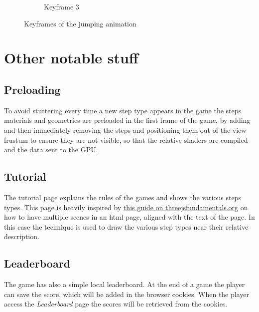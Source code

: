 \documentclass[12pt]{article}
\begin{document}
\begin{figure}[h]
\begin{subfigure}{.33\textwidth}
  \caption{Keyframe 3}
  \label{fig:key3}
 \end{subfigure}
\caption{Keyframes of the jumping animation}
\label{fig:keyframes}
\end{figure}

\newpage

\section{Other notable stuff}

\subsection{Preloading}
To avoid stuttering every time a new step type appears in the game the steps materials and geometries are preloaded in the first frame of the game, by adding and then immediately removing the steps and positioning them out of the view frustum to ensure they are not visible, so that the relative shaders are compiled and the data sent to the GPU.

\subsection{Tutorial}
The tutorial page explains the rules of the games and shows the various steps types. This page is heavily inspired by \href{https://threejsfundamentals.org/threejs/lessons/threejs-multiple-scenes.html}{this guide on threejsfundamentals.org} on how to have multiple scenes in an html page, aligned with the text of the page. In this case the technique is used to draw the various step types near their relative description.

\subsection{Leaderboard}
The game has also a simple local leaderboard. At the end of a game the player can save the score, which will be added in the browser cookies. When the player access the \textit{Leaderboard} page the scores will be retrieved from the cookies.
\end{document}
